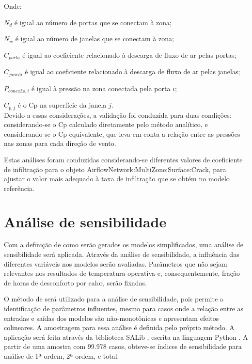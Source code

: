 \documentclass[brazil,hardcopy,openany,a5paper]{ufscthesis}
\begin{document}
		Onde:
		
		$N_d$ é igual ao número de portas que se conectam à zona;
		
		$N_w$ é igual ao número de janelas que se conectam à zona;
		
		$C_{porta}$ é igual ao coeficiente relacionado à descarga de fluxo de ar pelas portas;
		
		$C_{janela}$ é igual ao coeficiente relacionado à descarga de fluxo de ar pelas janelas;
		
		$P_{conexão,i}$ é igual à pressão na zona conectada pela porta $i$;
		
		$C_{p,j}$ é o Cp na superfície da janela $j$.
		\\
		
		Devido a essas considerações, a validação foi conduzida para duas condições: considerando-se o Cp calculado diretamente pelo método analítico, e considerando-se o Cp equivalente, que leva em conta a relação entre as pressões nas zonas para cada direção de vento.
		
		Estas análises foram conduzidas considerando-se diferentes valores de coeficiente de infiltração para o objeto AirflowNetwork:MultiZone:Surface:Crack, para ajustar o valor mais adequado à taxa de infiltração que se obtém no modelo referência.
		
		
		\section{Análise de sensibilidade}
		
		Com a definição de como serão gerados os modelos simplificados, uma análise de sensibilidade será aplicada. Através da análise de sensibilidade, a influência das diferentes variáveis nos modelos serão avaliadas. Parâmetros que não sejam relevantes nos resultados de temperatura operativa e, consequentemente, fração de horas de desconforto por calor, serão fixadas.
		
		O método de  \cite{Sobol1993} será utilizado para a análise de sensibilidade, pois permite a identificação de parâmetros influentes, mesmo para casos onde a relação entre as entradas e saídas dos modelos são não-monotônicas  e apresentam efeitos colineares. A amostragem para essa análise é definida pelo próprio método. A aplicação será feita através da biblioteca SALib \cite{Herman2017}, escrita na linguagem Python \cite{Python}. A partir de uma amostra com 99.978 casos, obteve-se índices de sensibilidade para análise de 1ª ordem, 2ª ordem, e total.
		
\end{document}

